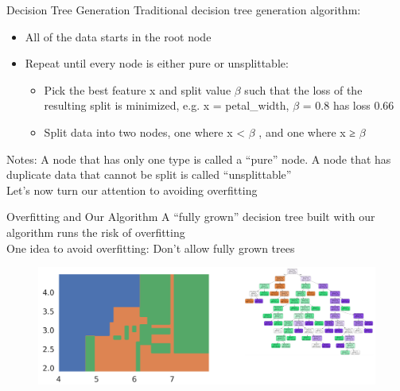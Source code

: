\documentclass[aspectratio=169]{../latex_main/tntbeamer}  %
\begin{document}
	
	\begin{frame}{Decision Tree Generation}
	    Traditional decision tree generation algorithm: 
	    \begin{itemize}
	        \item All of the data starts in the root node
	        \item Repeat until every node is either pure or unsplittable:
	        \begin{itemize}
	            \item Pick the best feature x and split value $\beta$ such that the loss of the resulting split is minimized, e.g. x = petal\_width, $\beta$ = 0.8 has loss 0.66
	            \item Split data into two nodes, one where x < $\beta$ , and one where x ≥ $\beta$ 
	        \end{itemize}
	    \end{itemize}
	    Notes: A node that has only one type is called a “pure” node. A node that has duplicate data that cannot be split is called “unsplittable” \\
	    \bigskip
        Let’s now turn our attention to avoiding overfitting

	\end{frame}
	
	
	
	\begin{frame}{Overfitting and Our Algorithm}
	    A “fully grown” decision tree built with our algorithm runs the risk of overfitting\\
	    \bigskip
	    One idea to avoid overfitting: Don’t allow fully grown trees
	    \begin{figure}
	        \centering
	        \includegraphics[scale=.45]{Bild52}
	    \end{figure}
	\end{frame}
	
\end{document}
